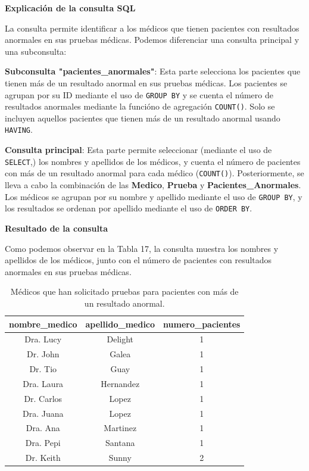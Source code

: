 \documentclass[spanish]{article}
\begin{document}
\textbf{Explicación de la consulta SQL}

La consulta permite identificar a los médicos que tienen pacientes con resultados anormales en sus pruebas médicas. Podemos diferenciar una consulta principal y una subconsulta:

\textbf{Subconsulta "pacientes\_anormales"}: Esta parte selecciona los pacientes que tienen más de un resultado anormal en sus pruebas médicas. Los pacientes se agrupan por su ID mediante el uso de \texttt{GROUP BY} y se cuenta el número de resultados anormales mediante la funcióno de agregación \texttt{COUNT()}. Solo se incluyen aquellos pacientes que tienen más de un resultado anormal usando \texttt{HAVING}.

\textbf{Consulta principal}: Esta parte permite seleccionar (mediante el uso de \texttt{SELECT},) los nombres y apellidos de los médicos, y cuenta el número de pacientes con más de un resultado anormal para cada médico (\texttt{COUNT()}). Posteriormente, se lleva a cabo la combinación de las  \textbf{Medico}, \textbf{Prueba} y \textbf{Pacientes\_Anormales}. Los médicos se agrupan por su nombre y apellido mediante el uso de \texttt{GROUP BY}, y los resultados se ordenan por apellido mediante el uso de \texttt{ORDER BY}.

\textbf{Resultado de la consulta}

Como podemos observar en la Tabla 17, la consulta muestra los nombres y apellidos de los médicos, junto con el número de pacientes con resultados anormales en sus pruebas médicas.

\begin{table}[h!]
\centering
\begin{tabular}{|c|c|c|}
\hline
\textbf{nombre\_medico} & \textbf{apellido\_medico} & \textbf{numero\_pacientes} \\
\hline
Dra. Lucy & Delight & 1 \\
\hline
Dr. John & Galea & 1 \\
\hline
Dr. Tio & Guay & 1 \\
\hline
Dra. Laura & Hernandez & 1 \\
\hline
Dr. Carlos & Lopez & 1 \\
\hline
Dra. Juana & Lopez & 1 \\
\hline
Dra. Ana & Martinez & 1 \\
\hline
Dra. Pepi & Santana & 1 \\
\hline
Dr. Keith & Sunny & 2 \\
\hline
\end{tabular}
\caption{Médicos que han solicitado pruebas para pacientes con más de un resultado anormal.}
\label{tab:medicos}
\end{table}
\end{document}
